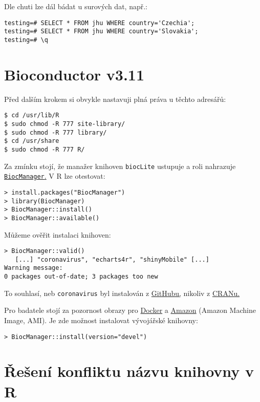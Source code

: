 Dle chuti lze dál bádat u surových dat, např.:
\begin{lstlisting}
testing=# SELECT * FROM jhu WHERE country='Czechia';
testing=# SELECT * FROM jhu WHERE country='Slovakia';
testing=# \q
\end{lstlisting}



\section{Bioconductor v3.11}

Před dalším krokem si obvykle nastavuji plná práva u těchto adresářů:
\begin{lstlisting}
$ cd /usr/lib/R
$ sudo chmod -R 777 site-library/
$ sudo chmod -R 777 library/
$ cd /usr/share
$ sudo chmod -R 777 R/
\end{lstlisting}

Za zmínku stojí, že manažer knihoven \texttt{biocLite} ustupuje a roli nahrazuje \href{https://www.bioconductor.org/install/}{\texttt{BiocManager}.} V R lze otestovat:
\begin{lstlisting}
> install.packages("BiocManager")
> library(BiocManager)
> BiocManager::install()
> BiocManager::available()
\end{lstlisting}

Můžeme ověřit instalaci knihoven:

\begin{lstlisting}
> BiocManager::valid()
   [...] "coronavirus", "echarts4r", "shinyMobile" [...]
Warning message:
0 packages out-of-date; 3 packages too new 
\end{lstlisting}

To souhlasí, neb \texttt{coronavirus} byl instalován z 
\href{https://github.com/JohnCoene/coronavirus}{GitHubu,} nikoliv z \href{https://cran.r-project.org/}{CRANu.}

Pro badatele stojí za pozornost obrazy pro \href{https://www.bioconductor.org/help/docker/}{Docker} a \href{https://www.bioconductor.org/help/bioconductor-cloud-ami/}{Amazon} (Amazon Machine Image, AMI). Je zde možnost instalovat vývojářské knihovny:
\begin{lstlisting}
> BiocManager::install(version="devel")
\end{lstlisting}




\section{Řešení konfliktu názvu knihovny v R}

